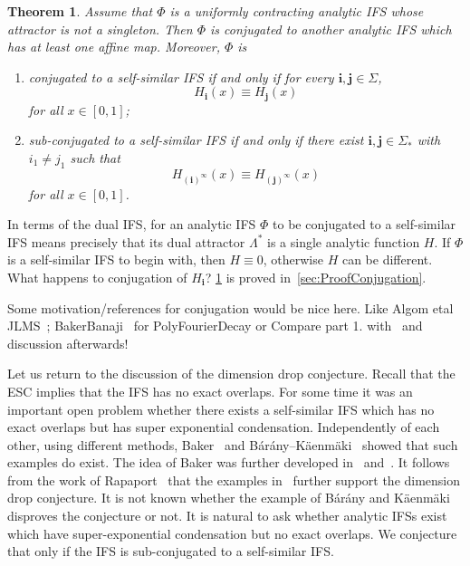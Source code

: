 \documentclass[12pt,]{article}
\def\cref#1{\ref{#1}}%
\newtheorem{theorem}{Theorem}[section]
\theoremstyle{definition}
\theoremstyle{remark}
\newcommand{\0}{\mathbf{0}}
\newcommand{\bi}{\mathbf{i}}
\newcommand{\bj}{\mathbf{j}}
\begin{document}
{\begin{theorem}\label{thm:SubConjugation}
Assume that $\Phi$ is a uniformly contracting analytic IFS whose attractor is not a singleton. Then
$\Phi$ is conjugated to another analytic IFS which has at least one affine map. Moreover, $\Phi$ is 
\begin{enumerate}
\item conjugated to a self-similar IFS if and only if for every $\bi,\bj\in\Sigma$,
\[
H_{\bi}(x) \equiv H_{\bj}(x)
\]
for all $x\in[0,1]$;
\item sub-conjugated to a self-similar IFS if and only if there exist $\bi,\bj\in\Sigma_*$ with
  $i_1\neq j_1$ such that 
\[
H_{(\bi)^\infty}(x) \equiv H_{(\bj)^\infty}(x)
\]
for all $x\in[0,1]$.
\end{enumerate}
\end{theorem}

In terms of the dual IFS, for an analytic IFS $\Phi$ to be conjugated to a self-similar IFS means
precisely that its dual attractor $\Lambda^*$ is a single analytic function $H$. If $\Phi$ is a
self-similar IFS to begin with, then $H\equiv 0$, otherwise $H$ can be different. {\color{red} What
happens to conjugation of $H_{\bi}$?} \cref{thm:SubConjugation} is proved
in~\cref{sec:ProofConjugation}.

{\color{red} Some motivation/references for conjugation would be nice here. Like Algom etal
JLMS~\cite{AlgomEtal_LogFourierDecaySelfConf_JLMS}; BakerBanaji~\cite{BakerBanaji_PolyFourierDecay}
for PolyFourierDecay or Compare part 1. with~\cite[Corollary 1.2 part
3.]{AlgomEtal_PointwiseNormalityFDecaySelfSonf_AdvMath21} and discussion afterwards!}

Let us return to the discussion of the dimension drop conjecture. Recall
that the ESC implies that the IFS has no exact overlaps. For some time it was an important open
problem whether there exists a self-similar IFS which has no exact overlaps but has super
exponential condensation. Independently of each other, using different methods,
Baker~\cite{Baker_SuperExpCloseIFS_AdvMath} and
B\'ar\'any--K\"{a}enm\"{a}ki~\cite{BaranyKaenmaki_SuperExpCLoseIFS} showed that such examples do
exist. The idea of Baker was further developed in~\cite{Baker_SuperExpCloseIFS2_ProcAMS}
and~\cite{Chen_SuperExpNoExactOVerlapExample}. It follows from the work of
Rapaport~\cite{Rapaport_ExactOverlapsAlgebraicContr} that the examples
in~\cite{Baker_SuperExpCloseIFS_AdvMath, Baker_SuperExpCloseIFS2_ProcAMS,
Chen_SuperExpNoExactOVerlapExample} further support the dimension drop conjecture. It is not known
whether the example of B\'ar\'any and K\"{a}enm\"{a}ki disproves the conjecture or not. It is
natural to ask whether analytic IFSs exist which have super-exponential condensation but no exact
overlaps. We conjecture that only if the IFS is sub-conjugated to a self-similar IFS.

}
\end{document}
